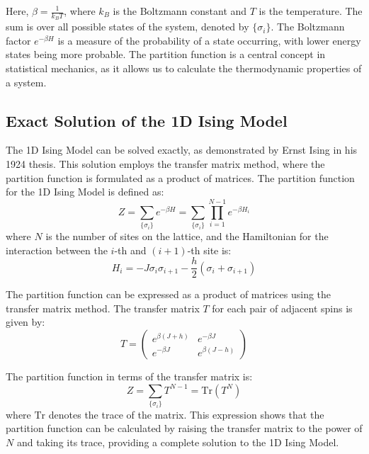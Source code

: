 Here, $\beta = \frac{1}{k_B T}$, where $k_B$ is the Boltzmann constant and $T$
is the temperature. The sum is over all possible states of the system, denoted
by $\{\sigma_i\}$. The Boltzmann factor $e^{-\beta H}$ is a measure of the
probability of a state occurring, with lower energy states being more probable.
The partition function is a central concept in statistical mechanics, as it
allows us to calculate the thermodynamic properties of a system.

\subsection{Exact Solution of the 1D Ising Model}
The 1D Ising Model can be solved exactly, as demonstrated by Ernst Ising in his
1924 thesis. This solution employs the transfer matrix method, where the
partition function is formulated as a product of matrices. The partition
function for the 1D Ising Model is defined as:
\begin{equation}
  \label{eq:partition1d}
  Z = \sum_{\{\sigma_i\}} e^{-\beta H} = \sum_{\{\sigma_i\}} \prod_{i=1}^{N-1} e^{-\beta H_i}
\end{equation}
where \( N \) is the number of sites on the lattice, and the Hamiltonian for the
interaction between the \( i \)-th and \( (i+1) \)-th site is:
\begin{equation}
  \label{eq:hamiltonian1d}
  H_i = -J \sigma_i \sigma_{i+1} - \frac{h}{2} (\sigma_i + \sigma_{i+1})
\end{equation}

The partition function can be expressed as a product of matrices using the
transfer matrix method. The transfer matrix \( T \) for each pair of adjacent
spins is given by:
\begin{equation}
  \label{eq:transfer1d}
  T = \begin{pmatrix}
    e^{\beta(J+h)} & e^{-\beta J} \\
    e^{-\beta J} & e^{\beta(J-h)}
  \end{pmatrix}
\end{equation}

The partition function in terms of the transfer matrix is:
\begin{equation}
  \label{eq:partition1dmat2}
  Z = \sum_{\{\sigma_i\}} T^{N-1} = \text{Tr}(T^N)
\end{equation}
where \( \text{Tr} \) denotes the trace of the matrix. This expression shows
that the partition function can be calculated by raising the transfer matrix to
the power of \( N \) and taking its trace, providing a complete solution to the
1D Ising Model.

